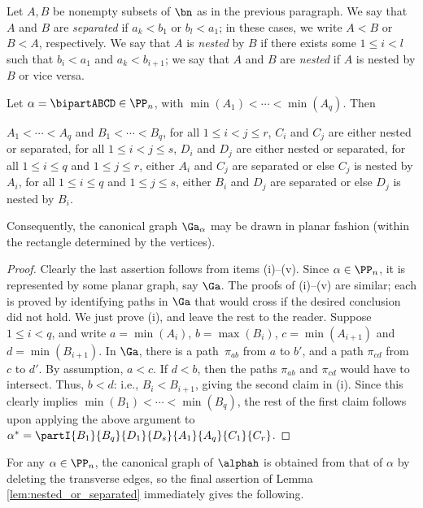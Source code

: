 Let $A,B$ be nonempty subsets of $\bn$ as in the previous paragraph.  We say that $A$ and $B$ are \emph{separated} if $a_k<b_1$ or $b_l<a_1$; in these cases, we write $A<B$ or $B<A$, respectively.  We say that $A$ is \emph{nested} by $B$ if there exists some $1\leq i<l$ such that $b_i<a_1$ and $a_k<b_{i+1}$; we say that $A$ and $B$ are \emph{nested} if $A$ is nested by $B$ or vice versa.  


\begin{lemma}\label{lem:nested_or_separated}
Let $\alpha=\bipartABCD\in\PP_n$, with $\min(A_1)<\cdots<\min(A_q)$.  Then
\begin{itemize}
 $A_1<\cdots<A_q$ and $B_1<\cdots<B_q$,
 for all $1\leq i<j\leq r$, $C_i$ and $C_j$ are either nested or separated,
 for all $1\leq i<j\leq s$, $D_i$ and $D_j$ are either nested or separated,
 for all $1\leq i\leq q$ and $1\leq j\leq r$, either $A_i$ and $C_j$ are separated or else $C_j$ is nested by $A_i$, 
 for all $1\leq i\leq q$ and $1\leq j\leq s$, either $B_i$ and $D_j$ are separated or else $D_j$ is nested by $B_i$.
\end{itemize}
Consequently, the canonical graph $\Ga_\alpha$ may be drawn in planar fashion (within the rectangle determined by the vertices).
\end{lemma}

\begin{proof} Clearly the last assertion follows from items (i)--(v).  Since $\alpha\in\PP_n$, it is represented by some planar graph, say $\Ga$.
%
The proofs of (i)--(v) are similar; each is proved by identifying paths in
$\Ga$ that would cross if the desired conclusion did not hold.  We just prove
(i), and leave the rest to the reader.  Suppose $1\leq i<q$, and write $a=\min(A_i)$, $b=\max(B_i)$, $c=\min(A_{i+1})$ and $d=\min(B_{i+1})$.  In $\Ga$, there is a path~$\pi_{ab}$ from $a$ to $b'$, and a path $\pi_{cd}$ from $c$ to $d'$.  By assumption, $a<c$.  If $d<b$, then the paths $\pi_{ab}$ and $\pi_{cd}$ would have to intersect.  Thus, $b<d$: i.e., $B_i<B_{i+1}$, giving the second claim in (i).  Since this clearly implies $\min(B_1)<\cdots<\min(B_q)$, the rest of the first claim follows upon applying the above argument to $\alpha^*=\partI{B_1}{B_q}{D_1}{D_s}{A_1}{A_q}{C_1}{C_r}$. \end{proof}

For any $\alpha\in\PP_n$, the canonical graph of $\alphah$ is obtained from that of $\alpha$ by deleting the transverse edges, so the final assertion of Lemma \ref{lem:nested_or_separated} immediately gives the following.


